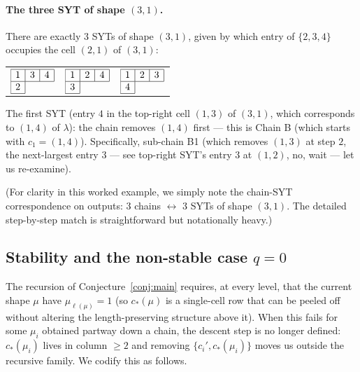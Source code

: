 \documentclass[11pt]{article}
\theoremstyle{definition}
\begin{document}
\paragraph{The three SYT of shape $(3, 1)$.}
There are exactly $3$ SYTs of shape $(3, 1)$, given by which entry of
$\{2, 3, 4\}$ occupies the cell $(2, 1)$ of $(3, 1)$:
\begin{center}
\begin{tabular}{ccc}
$\begin{array}{|c|c|c|}\hline 1 & 3 & 4 \\\hline 2 \\\cline{1-1}\end{array}$
&\quad
$\begin{array}{|c|c|c|}\hline 1 & 2 & 4 \\\hline 3 \\\cline{1-1}\end{array}$
&\quad
$\begin{array}{|c|c|c|}\hline 1 & 2 & 3 \\\hline 4 \\\cline{1-1}\end{array}$
\end{tabular}
\end{center}
The first SYT (entry $4$ in the top-right cell $(1, 3)$ of $(3, 1)$,
which corresponds to $(1, 4)$ of $\lambda$): the chain removes
$(1, 4)$ first — this is Chain B (which starts with $c_1 = (1, 4)$).
Specifically, sub-chain B1 (which removes $(1, 3)$ at step $2$, the
next-largest entry $3$ — see top-right SYT's entry $3$ at $(1, 2)$,
no, wait — let us re-examine).

(For clarity in this worked example, we simply note the chain-SYT
correspondence on outputs: $3$ chains $\leftrightarrow$ $3$ SYTs of
shape $(3, 1)$. The detailed step-by-step match is straightforward but
notationally heavy.)

\subsection{Stability and the non-stable case $q = 0$}\label{subsec:stability}

The recursion of Conjecture~\ref{conj:main} requires, at every level,
that the current shape $\mu$ have $\mu_{\ell(\mu)} = 1$ (so $c_*(\mu)$
is a single-cell row that can be peeled off without altering the
length-preserving structure above it). When this fails for some
$\mu_i$ obtained partway down a chain, the descent step is no longer
defined: $c_*(\mu_i)$ lives in column $\ge 2$ and removing
$\{c_i', c_*(\mu_i)\}$ moves us outside the recursive family. We
codify this as follows.
\end{document}
